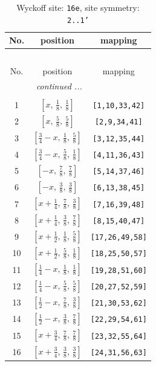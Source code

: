 \documentclass[fleqn,8pt]{jsarticle}
\begin{document}
\renewcommand{\arraystretch}{1.2}
\begin{longtable}{ccc}
\caption{Wyckoff site: {\tt 16e}, site symmetry: {\tt 2..1'}}
 \\
 \hline \hline
No. & position & mapping \\ \hline \endfirsthead

\multicolumn{2}{l}{\tablename\ \thetable{}} \\
 \hline \hline
No. & position & mapping \\ \hline \endhead

 \hline \hline
\multicolumn{2}{r}{\footnotesize\it continued ...} \\ \endfoot

 \hline \hline
\multicolumn{2}{r}{} \\ \endlastfoot

1 & $\left[ x,\, \frac{1}{8},\, \frac{1}{8} \right]$ & {\tt [1,10,33,42]} \\ \hline
2 & $\left[ x,\, \frac{5}{8},\, \frac{5}{8} \right]$ & {\tt [2,9,34,41]} \\ \hline
3 & $\left[ \frac{3}{4} - x,\, \frac{1}{8},\, \frac{5}{8} \right]$ & {\tt [3,12,35,44]} \\ \hline
4 & $\left[ \frac{3}{4} - x,\, \frac{5}{8},\, \frac{1}{8} \right]$ & {\tt [4,11,36,43]} \\ \hline
5 & $\left[ - x,\, \frac{7}{8},\, \frac{7}{8} \right]$ & {\tt [5,14,37,46]} \\ \hline
6 & $\left[ - x,\, \frac{3}{8},\, \frac{3}{8} \right]$ & {\tt [6,13,38,45]} \\ \hline
7 & $\left[ x + \frac{1}{4},\, \frac{7}{8},\, \frac{3}{8} \right]$ & {\tt [7,16,39,48]} \\ \hline
8 & $\left[ x + \frac{1}{4},\, \frac{3}{8},\, \frac{7}{8} \right]$ & {\tt [8,15,40,47]} \\ \hline
9 & $\left[ x + \frac{1}{2},\, \frac{1}{8},\, \frac{5}{8} \right]$ & {\tt [17,26,49,58]} \\ \hline
10 & $\left[ x + \frac{1}{2},\, \frac{5}{8},\, \frac{1}{8} \right]$ & {\tt [18,25,50,57]} \\ \hline
11 & $\left[ \frac{1}{4} - x,\, \frac{1}{8},\, \frac{1}{8} \right]$ & {\tt [19,28,51,60]} \\ \hline
12 & $\left[ \frac{1}{4} - x,\, \frac{5}{8},\, \frac{5}{8} \right]$ & {\tt [20,27,52,59]} \\ \hline
13 & $\left[ \frac{1}{2} - x,\, \frac{7}{8},\, \frac{3}{8} \right]$ & {\tt [21,30,53,62]} \\ \hline
14 & $\left[ \frac{1}{2} - x,\, \frac{3}{8},\, \frac{7}{8} \right]$ & {\tt [22,29,54,61]} \\ \hline
15 & $\left[ x + \frac{3}{4},\, \frac{7}{8},\, \frac{7}{8} \right]$ & {\tt [23,32,55,64]} \\ \hline
16 & $\left[ x + \frac{3}{4},\, \frac{3}{8},\, \frac{3}{8} \right]$ & {\tt [24,31,56,63]} \\
\end{longtable}
\end{document}
